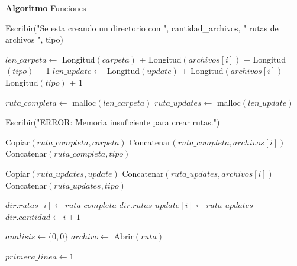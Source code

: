 \begin{tcolorbox}[colback=white, colframe=azul_unam, 
title=Pseudocódigo: funciones.c, breakable]

\textbf{Algoritmo} Funciones

\begin{algorithmic}[1]



\State Escribir("Se esta creando un directorio con ", cantidad\_archivos, " rutas de archivos ", tipo)


    \State $len\_carpeta \gets$ Longitud$(carpeta)$ + Longitud$(archivos[i])$ + Longitud$(tipo)$ + 1
    \State $len\_update \gets$ Longitud$(update)$ + Longitud$(archivos[i])$ + Longitud$(tipo)$ + 1

    \State $ruta\_completa \gets$ malloc$(len\_carpeta)$
    \State $ruta\_updates \gets$ malloc$(len\_update)$

        \State Escribir("ERROR: Memoria insuficiente para crear rutas.")
        \State \Return
    \EndIf

    \State Copiar$(ruta\_completa, carpeta)$
    \State Concatenar$(ruta\_completa, archivos[i])$
    \State Concatenar$(ruta\_completa, tipo)$

    \State Copiar$(ruta\_updates, update)$
    \State Concatenar$(ruta\_updates, archivos[i])$
    \State Concatenar$(ruta\_updates, tipo)$

    \State $dir.rutas[i] \gets ruta\_completa$
    \State $dir.rutas\_update[i] \gets ruta\_updates$
    \State $dir.cantidad \gets i + 1$

\EndFor

\EndProcedure

\vspace{0.3cm}



\State $analisis \gets \{0,0\}$
\State $archivo \gets$ Abrir$(ruta)$

\State $primera\_linea \gets 1$



\end{algorithmic}
\end{tcolorbox}

